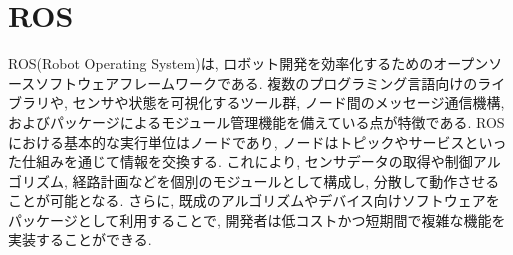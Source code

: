 \section{ROS}
ROS(Robot Operating System)は, ロボット開発を効率化するためのオープンソースソフトウェアフレームワークである. 
複数のプログラミング言語向けのライブラリや, センサや状態を可視化するツール群, ノード間のメッセージ通信機構, およびパッケージによるモジュール管理機能を備えている点が特徴である. 
ROSにおける基本的な実行単位はノードであり, ノードはトピックやサービスといった仕組みを通じて情報を交換する. 
これにより, センサデータの取得や制御アルゴリズム, 経路計画などを個別のモジュールとして構成し, 分散して動作させることが可能となる. 
さらに, 既成のアルゴリズムやデバイス向けソフトウェアをパッケージとして利用することで, 開発者は低コストかつ短期間で複雑な機能を実装することができる. 



